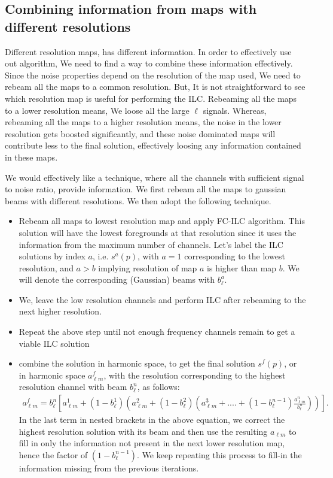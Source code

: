 \subsection{Combining information from maps with different resolutions}
Different resolution maps, has different information. In order to effectively use
out algorithm, We need to find a way to combine these information effectively. \cite{datarishi}
Since the noise properties depend on the resolution of the map used, We need to rebeam
all the maps to a common resolution. 
But, It is not straightforward to see which resolution map is useful for performing the ILC.
Rebeaming all the maps to a lower resolution means, We loose all the large $\ell$ signals. Whereas,
rebeaming all the maps to a higher resolution means, the noise in the lower resolution gets boosted
significantly, and these noise dominated maps will contribute less to the final solution, 
effectively loosing any information contained in these maps.

We would effectively like a technique, where all the channels with sufficient signal to noise ratio, provide information.
We first rebeam all the maps to gaussian beams with different resolutions. We then adopt the following technique.
\begin{itemize}
\item Rebeam all maps to lowest resolution map and apply FC-ILC
  algorithm. This solution will have the lowest foregrounds at that resolution
  since it uses the information from the maximum number of channels. Let's
  label the ILC solutions by index $a$, i.e. $s^a(p)$, with $a=1$ corresponding to the
  lowest resolution, and $a>b$ implying resolution of map $a$ is higher
  than map $b$. We will denote the corresponding (Gaussian) beams with $b_{\ell}^a$.
\item We, leave the low resolution channels and perform ILC after rebeaming to the next higher resolution.
\item Repeat the above step until not enough frequency channels remain to get a
  viable ILC solution
\item combine the solution in harmonic space, to get
  the final solution $s^f(p)$, or in harmonic space $a_{\ell m}^f$, with the resolution corresponding to the
  highest resolution channel with beam $b_{\ell}^n$, as follows:
\begin{align}
a_{\ell m}^f= 
b_{\ell}^n\left[a_{\ell m}^1+(1-b_{\ell}^{1})\left( a_{\ell m}^{2} + (1-b_{\ell}^{2})
\left(  a_{\ell m}^{3} + .... + \left(1-b_{\ell}^{n-1}\right)\frac{a_{\ell m}^n }{b_{\ell}^n}\right)\right)\right].
\end{align}
In the last term in nested brackets in the above equation, we correct the
highest resolution solution with its beam and then use the resulting
$a_{\ell m}$ to fill in only the information not present in the next lower
resolution map, hence the factor of $(1-b_{\ell}^{n-1})$.
We keep repeating this process to fill-in the information missing from the previous iterations.
\end{itemize}


